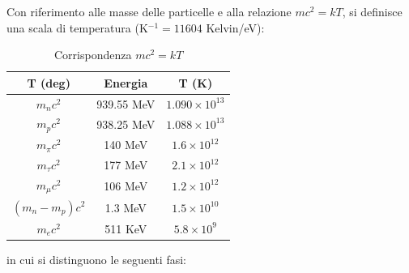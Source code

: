 Con riferimento alle masse delle particelle e alla relazione $m c^2 = kT$, si
definisce una scala di temperatura (K$^{-1} = 11604$ Kelvin/eV):
\begin{table}
  \centering{}
  \caption{Corrispondenza $m c^2 = kT$}
  \label{massa_temp}
  \begin{tabular}{ccc}
    \toprule
    T (deg)         & Energia    & T (K)              \\
    \midrule
    $m_n c^2$       & 939.55 MeV & $1.090 \times 10^{13}$ \\
    $m_p c^2 $      & 938.25 MeV & $1.088 \times 10^{13}$ \\
    $m_{\pi} c^2$   & 140    MeV & $1.6   \times 10^{12}$ \\
    $m_{\tau}c^2$   & 177    MeV & $2.1   \times 10^{12}$ \\
    $m_{\mu} c^2 $  & 106    MeV & $1.2   \times 10^{12}$ \\
    $(m_n-m_p) c^2$ & 1.3    MeV & $1.5   \times 10^{10}$ \\
    $m_e c^2      $ & 511    KeV & $5.8   \times 10^{9 }$ \\
    \bottomrule
  \end{tabular}
\end{table}
in cui si distinguono le seguenti fasi:

